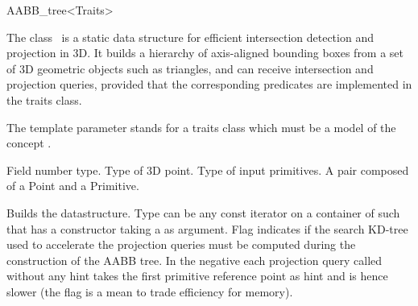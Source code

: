 \ccRefPageBegin


\begin{ccRefClass}{AABB_tree<Traits>}  %


\ccDefinition
  
The class \ccRefName\ is a static data structure for efficient intersection detection and projection in 3D. It builds a hierarchy of axis-aligned bounding boxes from a set of 3D geometric objects such as triangles, and can receive intersection and projection queries, provided that the corresponding predicates are implemented in the traits class. 

The template parameter  stands for a traits class which must be a model of the concept .


\ccTypes

          {Field number type.}
\ccGlue
{}
          {Type of 3D point.}
\ccGlue
{}
          {Type of input primitives.}
\ccGlue
{}
          {A pair composed of a Point and a Primitive.}


\ccCreation
{} %

{Builds the datastructure. Type  can be any const iterator on a container of  such that  has a constructor taking a  as argument. Flag  indicates if the search KD-tree used to accelerate the projection queries must be computed during the construction of the AABB tree. In the negative each projection query called without any hint takes the first primitive reference point as hint and is hence slower (the flag is a mean to trade efficiency for memory). }


\end{ccRefClass}
